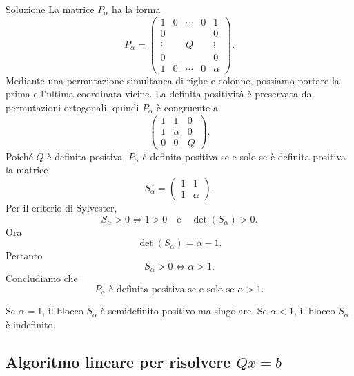 \documentclass[a4paper]{article}
\begin{document}
\begin{snippetsolution}{Soluzione}
    La matrice \(P_\alpha\) ha la forma
    \[
        P_\alpha=
        \begin{pmatrix}
            1 & 0 & \cdots & 0 & 1\\
            0 & & & & 0\\
            \vdots & & Q & & \vdots\\
            0 & & & & 0\\
            1 & 0 & \cdots & 0 & \alpha
        \end{pmatrix}.
    \]
    Mediante una permutazione simultanea di righe e colonne, possiamo portare la prima e l'ultima coordinata vicine. La definita positività è preservata da permutazioni ortogonali, quindi \(P_\alpha\) è congruente a
    \[
        \begin{pmatrix}
            1 & 1 & 0\\
            1 & \alpha & 0\\
            0 & 0 & Q
        \end{pmatrix}.
    \]
    Poiché \(Q\) è definita positiva, \(P_\alpha\) è definita positiva se e solo se è definita positiva la matrice
    \[
        S_\alpha=
        \begin{pmatrix}
            1 & 1\\
            1 & \alpha
        \end{pmatrix}.
    \]
    Per il criterio di Sylvester,
    \[
        S_\alpha>0
        \Longleftrightarrow
        1>0
        \quad\text{e}\quad
        \det(S_\alpha)>0.
    \]
    Ora
    \[
        \det(S_\alpha)=\alpha-1.
    \]
    Pertanto
    \[
        S_\alpha>0
        \Longleftrightarrow
        \alpha>1.
    \]
    Concludiamo che
    \[
        \boxed{
            P_\alpha \text{ è definita positiva se e solo se } \alpha>1.
        }
    \]

    Se \(\alpha=1\), il blocco \(S_\alpha\) è semidefinito positivo ma singolare. Se \(\alpha<1\), il blocco \(S_\alpha\) è indefinito.

    \subsection*{Algoritmo lineare per risolvere \(Qx=b\)}


\end{snippetsolution}
\end{document}
